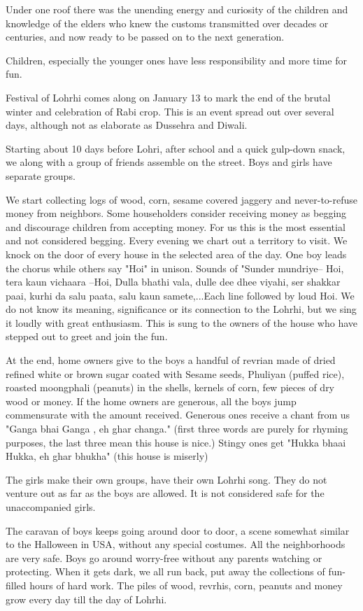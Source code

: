 Under one roof there was the unending energy and curiosity of the children
and knowledge of the elders who knew the customs transmitted over decades
or centuries, and now ready to be passed on to the next generation. 

Children, especially the younger ones have less responsibility and more
time for fun. 

Festival of Lohrhi comes along on January 13 to mark the end of the brutal
winter and celebration of Rabi crop. This is an event spread out over
several days, although not as elaborate as Dussehra and Diwali. 

Starting about 10 days before Lohri, after school and a quick gulp-down
snack, we along with a group of friends assemble on the street. Boys and
girls have separate groups. 

We start collecting logs of wood, corn, sesame covered jaggery and
never-to-refuse money from neighbors. Some householders consider receiving
money as begging and discourage children from accepting money. For us this
is the most essential and not considered begging. Every evening we chart
out a territory to visit. We knock on the door of every house in the
selected area of the day. One boy leads the chorus while others say "Hoi"
in unison. Sounds of "Sunder mundriye-- Hoi, tera kaun vichaara --Hoi,
Dulla bhathi vala, dulle dee dhee viyahi, ser shakkar paai, kurhi da salu
paata, salu kaun samete,...Each line followed by loud Hoi. We do not know
its meaning, significance or its connection to the Lohrhi, but we sing it
loudly with great enthusiasm. This is sung to the owners of the house who
have stepped out to greet and join the fun. 

At the end, home owners give to the boys a handful of revrian made of
dried refined white or brown sugar coated with Sesame seeds, Phuliyan
(puffed rice), roasted moongphali (peanuts) in the shells, kernels of
corn, few pieces of dry wood or money. If the home owners are generous,
all the boys jump commensurate with the amount received. Generous ones
receive a chant from us "Ganga bhai Ganga , eh ghar changa." (first three
words are purely for rhyming purposes, the last three mean this house is
nice.) Stingy ones get "Hukka bhaai Hukka, eh ghar bhukha" (this house is
miserly)

The girls make their own groups, have their own Lohrhi song. They do not
venture out as far as the boys are allowed. It is not considered safe for
the unaccompanied girls. 

The caravan of boys keeps going around door to door, a scene somewhat
similar to the Halloween in USA, without any special costumes.  All the
neighborhoods are very safe. Boys go around worry-free without any parents
watching or protecting. When it gets dark, we all run back, put away the
collections of fun-filled hours of hard work. The piles of wood, revrhis,
corn, peanuts and money grow every day till the day of Lohrhi. 


